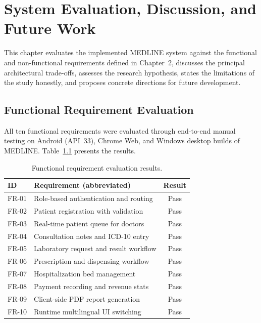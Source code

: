 \documentclass[12pt,a4paper,oneside]{report}
\newcommand{\source}[1]{\par\vspace{2pt}{\small\itshape Source: #1}\par}
\begin{document}
\chapter{System Evaluation, Discussion, and Future Work}

This chapter evaluates the implemented MEDLINE system against the functional and
non-functional requirements defined in Chapter~2, discusses the principal
architectural trade-offs, assesses the research hypothesis, states the
limitations of the study honestly, and proposes concrete directions for future
development.

\section{Functional Requirement Evaluation}

All ten functional requirements were evaluated through end-to-end manual testing
on Android (API~33), Chrome Web, and Windows desktop builds of MEDLINE.
Table~\ref{tab:freval} presents the results.

\begin{table}[htbp]
  \centering
  \caption{Functional requirement evaluation results.}
  \label{tab:freval}
  \begin{tabularx}{\textwidth}{l X c}
    \toprule
    \textbf{ID} & \textbf{Requirement (abbreviated)} & \textbf{Result}\\
    \midrule
    FR-01 & Role-based authentication and routing & Pass\\
    FR-02 & Patient registration with validation & Pass\\
    FR-03 & Real-time patient queue for doctors & Pass\\
    FR-04 & Consultation notes and ICD-10 entry & Pass\\
    FR-05 & Laboratory request and result workflow & Pass\\
    FR-06 & Prescription and dispensing workflow & Pass\\
    FR-07 & Hospitalization bed management & Pass\\
    FR-08 & Payment recording and revenue stats & Pass\\
    FR-09 & Client-side PDF report generation & Pass\\
    FR-10 & Runtime multilingual UI switching & Pass\\
    \bottomrule
  \end{tabularx}
  \source{author, end-to-end manual testing.}
\end{table}
\end{document}
